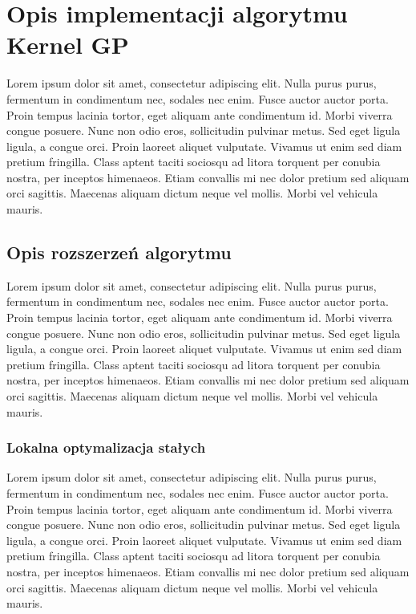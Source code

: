 \chapter{Opis implementacji algorytmu Kernel GP}
Lorem ipsum dolor sit amet, consectetur adipiscing elit. Nulla purus purus, fermentum in condimentum nec, sodales nec enim. Fusce auctor auctor porta. Proin tempus lacinia tortor, eget aliquam ante condimentum id. Morbi viverra congue posuere. Nunc non odio eros, sollicitudin pulvinar metus. Sed eget ligula ligula, a congue orci. Proin laoreet aliquet vulputate. Vivamus ut enim sed diam pretium fringilla. Class aptent taciti sociosqu ad litora torquent per conubia nostra, per inceptos himenaeos. Etiam convallis mi nec dolor pretium sed aliquam orci sagittis. Maecenas aliquam dictum neque vel mollis. Morbi vel vehicula mauris.

\section{Opis rozszerzeń algorytmu}
Lorem ipsum dolor sit amet, consectetur adipiscing elit. Nulla purus purus, fermentum in condimentum nec, sodales nec enim. Fusce auctor auctor porta. Proin tempus lacinia tortor, eget aliquam ante condimentum id. Morbi viverra congue posuere. Nunc non odio eros, sollicitudin pulvinar metus. Sed eget ligula ligula, a congue orci. Proin laoreet aliquet vulputate. Vivamus ut enim sed diam pretium fringilla. Class aptent taciti sociosqu ad litora torquent per conubia nostra, per inceptos himenaeos. Etiam convallis mi nec dolor pretium sed aliquam orci sagittis. Maecenas aliquam dictum neque vel mollis. Morbi vel vehicula mauris.

\subsection{Lokalna optymalizacja stałych}
Lorem ipsum dolor sit amet, consectetur adipiscing elit. Nulla purus purus, fermentum in condimentum nec, sodales nec enim. Fusce auctor auctor porta. Proin tempus lacinia tortor, eget aliquam ante condimentum id. Morbi viverra congue posuere. Nunc non odio eros, sollicitudin pulvinar metus. Sed eget ligula ligula, a congue orci. Proin laoreet aliquet vulputate. Vivamus ut enim sed diam pretium fringilla. Class aptent taciti sociosqu ad litora torquent per conubia nostra, per inceptos himenaeos. Etiam convallis mi nec dolor pretium sed aliquam orci sagittis. Maecenas aliquam dictum neque vel mollis. Morbi vel vehicula mauris.

